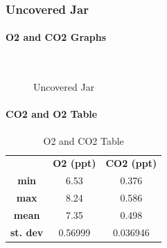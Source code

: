 \documentclass[a4paper, 12pt, english]{article}
\begin{document}
\subsubsection{Uncovered Jar}
\paragraph{O2 and CO2 Graphs}

\begin{figure}[H]
	\centering
	\\
	\qquad
	\qquad
	\caption{Uncovered Jar}
	\label{fig:UncoveredJar}
\end{figure}

\paragraph{CO2 and O2 Table}

\begin{table}[H]
	\caption{\label{tab:Table 1} O2 and CO2 Table}
	\centering
	\begin{tabular}{c c c}
		\toprule
		                 & \textbf{O2 (ppt)}
		                 & \textbf{CO2 (ppt)}           \\
		\cmidrule[0.4pt](r{0.125em}){1-1}%
		\cmidrule[0.4pt](lr{0.125em}){2-2}%
		\cmidrule[0.4pt](lr{0.125em}){3-3}%
		\textbf{min}     & 6.53                & 0.376   \\
		\textbf{max}     & 8.24               & 0.586   \\
		\textbf{mean}    & 7.35               & 0.498   \\
		\textbf{st. dev} & 0.56999            & 0.036946
	\end{tabular}
\end{table}
\end{document}
